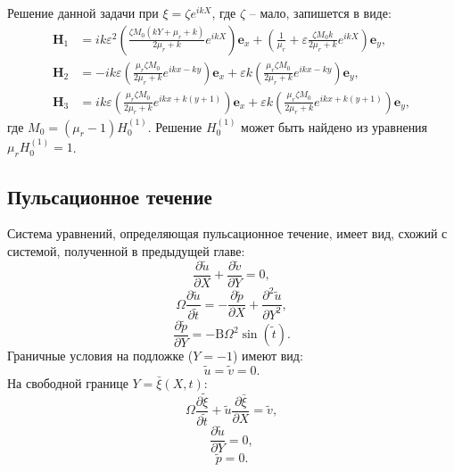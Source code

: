 \documentclass[12pt,a4paper]{article}
\begin{document}
Решение данной задачи при $\xi = \zeta e^{ikX}$, где $\zeta$ -- мало, запишется в виде:
\begin{align}
	\mathbf{H}_1 &= i k \varepsilon^2 \left( \frac{\zeta M_0 (kY + \mu_r + k)}{2\mu_r + k} e^{ikX} \right) \mathbf{e}_x + \left( \frac{1}{\mu_r} + \varepsilon \frac{\zeta M_0 k}{2\mu_r + k} e^{ikX} \right) \mathbf{e}_y, \\
	\mathbf{H}_2 &= -i k \varepsilon \left( \frac{\mu_r \zeta M_0}{2\mu_r + k} e^{ikx - ky} \right) \mathbf{e}_x + \varepsilon k \left( \frac{\mu_r \zeta M_0}{2\mu_r + k} e^{ikx - ky} \right) \mathbf{e}_y, \\
	\mathbf{H}_3 &= i k \varepsilon \left( \frac{\mu_r \zeta M_0}{2\mu_r + k} e^{ikx + k(y+1)} \right) \mathbf{e}_x + \varepsilon k \left( \frac{\mu_r \zeta M_0}{2\mu_r + k} e^{ikx + k(y+1)} \right) \mathbf{e}_y,
\end{align}
где $M_0 = (\mu_r - 1) H_0^{(1)}$. Решение $H_0^{(1)}$ может быть найдено из уравнения $\mu_r H_0^{(1)} = 1$.

\subsection{Пульсационное течение}

Система уравнений, определяющая пульсационное течение, имеет вид, схожий с системой, полученной в предыдущей главе:
\begin{equation}
	\frac{\partial \tilde{u}}{\partial X} + \frac{\partial \tilde{v}}{\partial Y} = 0,
\end{equation}
\begin{equation}
	\Omega \frac{\partial \tilde{u}}{\partial \tilde{t}} = -\frac{\partial \tilde{p}}{\partial X} + \frac{\partial^2 \tilde{u}}{\partial Y^2},
\end{equation}
\begin{equation}
	\frac{\partial \tilde{p}}{\partial Y} = -\mathrm{B} \Omega^2 \sin(\tilde{t}).
\end{equation}
Граничные условия на подложке ($Y = -1$) имеют вид:
\begin{equation}
	\tilde{u} = \tilde{v} = 0.
\end{equation}
На свободной границе $Y = \bar{\xi}(X, t)$:
\begin{equation}
	\Omega \frac{\partial \tilde{ \xi}}{\partial \tilde{t}} + \tilde{u} \frac{\partial \bar{\xi}}{\partial X} = \tilde{v},
\end{equation}
\begin{equation}
	\frac{\partial \tilde{u}}{\partial Y} = 0,
\end{equation}
\begin{equation}
	\tilde{p} = 0.
\end{equation}
\end{document}
